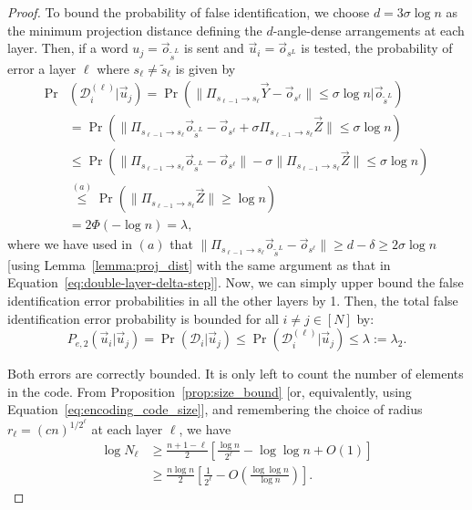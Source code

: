 \documentclass[10pt,conference]{IEEEtran}
\newcommand{\1}{\mathds{1}}
\newcommand{\cD}{\mathcal{D}}
\begin{document}
\begin{proof}
To bound the probability of false identification, we choose $d=3\sigma\log n$ as the minimum projection distance defining the $d$-angle-dense arrangements at each layer. Then, if a word $u_j=\vec{o}_{\tilde{s}^{L}}$ is sent and $\vec{u}_i=\vec{o}_{s^{L}}$ is tested, the probability of error a layer $\ell$ where $s_\ell\neq\tilde{s}_\ell$ is given by
\begin{equation}\label{eq:layer_error2}
\begin{split}
\Pr&(\cD_i^{(\ell)}|\vec{u}_j)=\Pr\left(\|\Pi_{s_{\ell-1}\to s_{\ell}}\vec{Y}-\vec{o}_{s^\ell}\|\leq\sigma\log n|\vec{o}_{\tilde{s}^{L}}\right)\\
&\!=\Pr\left(\|\Pi_{s_{\ell-1}\to s_{\ell}}\vec{o}_{\tilde{s}^{L}}-\vec{o}_{s^\ell}+\sigma \Pi_{s_{\ell-1}\to s_{\ell}}\vec{Z}\|\leq \sigma\log n\right)\\
&\!\leq\Pr\left(\|\Pi_{s_{\ell-1}\to s_{\ell}}\vec{o}_{\tilde{s}^{L}}-\vec{o}_{s^\ell}\|-\sigma\|\Pi_{s_{\ell-1}\to s_{\ell}}\vec{Z}\|\leq\sigma\log n\right)\\
&\!\stackrel{(a)}{\leq}\Pr\left(\|\Pi_{s_{\ell-1}\to s_{\ell}}\vec{Z}\|\geq\log n\right)\\
&=2\Phi(-\log n)=\lambda,
\end{split}
\end{equation}
where we have used in $(a)$ that $\|\Pi_{s_{\ell-1}\to s_{\ell}}\vec{o}_{\tilde{s}^{L}}-\vec{o}_{s^\ell}\|\geq d-\delta\geq 2\sigma\log n$ [using Lemma~\ref{lemma:proj_dist} with the same argument as that in Equation~\eqref{eq:double-layer-delta-step}]. Now, we can simply upper bound the false identification error probabilities in all the other layers by 1. Then, the total false identification error probability is bounded for all $i\neq j\in[N]$ by:
\begin{equation}\label{eq:main_Pe2}
P_{e,2}(\vec{u}_i|\vec{u}_j)=\Pr\left(\cD_i|\vec{u}_j\right)\leq\Pr\left(\cD_i^{(\ell)}|\vec{u}_j\right)\leq\lambda:=\lambda_2.
\end{equation}

Both errors are correctly bounded. It is only left to count the number of elements in the code. From Proposition~\ref{prop:size_bound} [or, equivalently, using Equation~\eqref{eq:encoding_code_size}], and remembering the choice of radius $r_\ell=(cn)^{1/2^\ell}$ at each layer $\ell$, we have
\begin{equation}
\begin{split}
\log N_\ell &\geq\frac{n+1-\ell}{2}\left[\frac{\log n}{2^\ell}-\log\log n+O(1)\right]\\
&\geq\frac{n\log n}{2}\left[\frac{1}{2^\ell}-O\left(\frac{\log \log n}{\log n}\right)\right].
\end{split}
\end{equation}


\end{proof}
\end{document}

